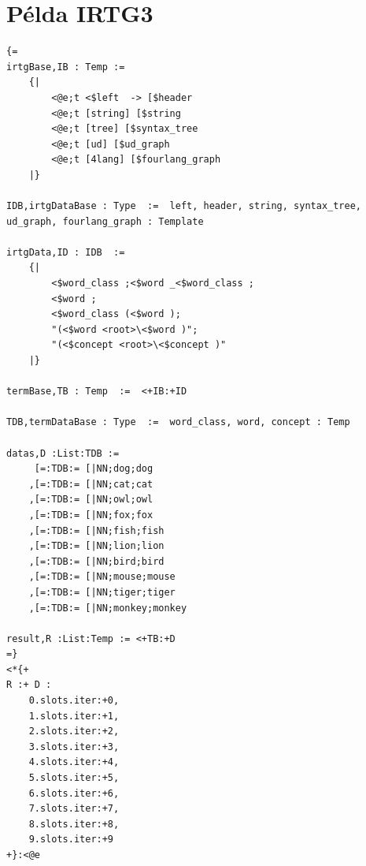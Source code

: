 \section{Példa IRTG3}
\label{sec:exampleIRTG3}
\begin{verbatim}
{= 
irtgBase,IB : Temp := 
	{|
		<@e;t <$left  -> [$header
		<@e;t [string] [$string
		<@e;t [tree] [$syntax_tree
		<@e;t [ud] [$ud_graph
		<@e;t [4lang] [$fourlang_graph
	|}

IDB,irtgDataBase : Type  :=  left, header, string, syntax_tree, ud_graph, fourlang_graph : Template

irtgData,ID : IDB  :=  
	{|
		<$word_class ;<$word _<$word_class ;
		<$word ;
		<$word_class (<$word );
		"(<$word <root>\<$word )";
		"(<$concept <root>\<$concept )"
	|}

termBase,TB : Temp  :=  <+IB:+ID

TDB,termDataBase : Type  :=  word_class, word, concept : Temp

datas,D :List:TDB :=
	 [=:TDB:= [|NN;dog;dog 
	,[=:TDB:= [|NN;cat;cat 
	,[=:TDB:= [|NN;owl;owl 
	,[=:TDB:= [|NN;fox;fox 
	,[=:TDB:= [|NN;fish;fish 
	,[=:TDB:= [|NN;lion;lion 
	,[=:TDB:= [|NN;bird;bird 
	,[=:TDB:= [|NN;mouse;mouse 
	,[=:TDB:= [|NN;tiger;tiger 
	,[=:TDB:= [|NN;monkey;monkey 

result,R :List:Temp := <+TB:+D 
=}
<*{+ 
R :+ D : 
	0.slots.iter:+0, 
	1.slots.iter:+1, 
	2.slots.iter:+2, 
	3.slots.iter:+3, 
	4.slots.iter:+4, 
	5.slots.iter:+5, 
	6.slots.iter:+6, 
	7.slots.iter:+7, 
	8.slots.iter:+8, 
	9.slots.iter:+9 
+}:<@e

\end{verbatim}


